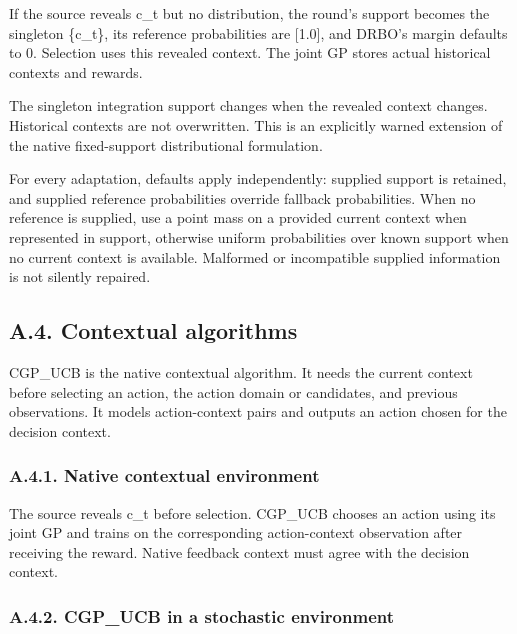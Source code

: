 \documentclass[10pt,a4paper]{article}
\begin{document}
If the source reveals c\_\allowbreak{}t but no distribution,\allowbreak{} the round's support becomes the singleton \{c\_\allowbreak{}t\},\allowbreak{} its reference probabilities are [1.0],\allowbreak{} and DRBO's margin defaults to 0. Selection uses this revealed context. The joint GP stores actual historical contexts and rewards.


The singleton integration support changes when the revealed context changes. Historical contexts are not overwritten. This is an explicitly warned extension of the native fixed-support distributional formulation.


For every adaptation,\allowbreak{} defaults apply independently: supplied support is retained,\allowbreak{} and supplied reference probabilities override fallback probabilities. When no reference is supplied,\allowbreak{} use a point mass on a provided current context when represented in support,\allowbreak{} otherwise uniform probabilities over known support when no current context is available. Malformed or incompatible supplied information is not silently repaired.


\subsection*{A.4. Contextual algorithms}

CGP\_\allowbreak{}UCB is the native contextual algorithm. It needs the current context before selecting an action,\allowbreak{} the action domain or candidates,\allowbreak{} and previous observations. It models action-context pairs and outputs an action chosen for the decision context.


\subsubsection*{A.4.1. Native contextual environment}

The source reveals c\_\allowbreak{}t before selection. CGP\_\allowbreak{}UCB chooses an action using its joint GP and trains on the corresponding action-context observation after receiving the reward. Native feedback context must agree with the decision context.


\subsubsection*{A.4.2. CGP\_\allowbreak{}UCB in a stochastic environment}
\end{document}
